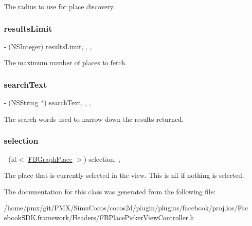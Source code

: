 The radius to use for place discovery. \mbox{\label{interfaceFBPlacePickerViewController_a8fa93f7498cf329da782ac179771c691}} 
\subsubsection{\texorpdfstring{results\+Limit}{resultsLimit}}
{\footnotesize\ttfamily -\/ (N\+S\+Integer) results\+Limit\hspace{0.3cm}{\ttfamily [read]}, {\ttfamily [write]}, {\ttfamily [nonatomic]}, {\ttfamily [assign]}}

The maximum number of places to fetch. \mbox{\label{interfaceFBPlacePickerViewController_a7e3a460b20cefff01be9400b18a4cfc9}} 
\subsubsection{\texorpdfstring{search\+Text}{searchText}}
{\footnotesize\ttfamily -\/ (N\+S\+String $\ast$) search\+Text\hspace{0.3cm}{\ttfamily [read]}, {\ttfamily [write]}, {\ttfamily [nonatomic]}, {\ttfamily [copy]}}

The search words used to narrow down the results returned. \mbox{\label{interfaceFBPlacePickerViewController_a2b28bd3f9ab163b1659434d8d5327039}} 
\subsubsection{\texorpdfstring{selection}{selection}}
{\footnotesize\ttfamily -\/ (id$<$ \hyperlink{protocolFBGraphPlace-p}{F\+B\+Graph\+Place} $>$) selection\hspace{0.3cm}{\ttfamily [read]}, {\ttfamily [nonatomic]}, {\ttfamily [retain]}}

The place that is currently selected in the view. This is nil if nothing is selected. 

The documentation for this class was generated from the following file\+:\begin{DoxyCompactItemize}
\item 
/home/pmx/git/\+P\+M\+X/\+Simu\+Cocos/cocos2d/plugin/plugins/facebook/proj.\+ios/\+Facebook\+S\+D\+K.\+framework/\+Headers/F\+B\+Place\+Picker\+View\+Controller.\+h\end{DoxyCompactItemize}
